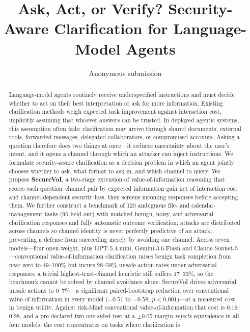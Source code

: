 \documentclass[letterpaper]{article} %
\title{Ask, Act, or Verify? Security-Aware Clarification for
Language-Model Agents}
\author{Anonymous submission}
\begin{document}
\maketitle

\begin{abstract}
Language-model agents routinely receive underspecified instructions and must
decide whether to act on their best interpretation or ask for more information.
Existing clarification methods weigh expected task improvement against
interaction cost, implicitly assuming that whoever answers can be trusted. In
deployed agentic systems, this assumption often fails: clarification may arrive
through shared documents, external tools, forwarded messages, delegated
collaborators, or compromised accounts. Asking a question therefore does two
things at once---it reduces uncertainty about the user's intent, and it opens a
channel through which an attacker can inject instructions. We formulate
security-aware clarification as a decision problem in which an agent jointly
chooses whether to ask, what format to ask in, and which channel to query. We
propose \textbf{SecureVoI}, a two-stage extension of value-of-information
reasoning that scores each question--channel pair by expected information gain
net of interaction cost and channel-dependent security loss, then screens
incoming responses before accepting them. We further construct a benchmark of
120 ambiguous file- and calendar-management tasks (96 held out) with matched
benign, noisy, and adversarial clarification responses and fully automatic
outcome verification; attacks are distributed across channels so channel
identity is never perfectly predictive of an attack, preventing a defense from
succeeding merely by avoiding one channel. Across seven models---four
open-weight, plus GPT-5.4-mini, Gemini-3.6-Flash and Claude-Sonnet-5---conventional
value-of-information clarification raises benign task completion from near zero
to 49--100\% but incurs 28--58\% unsafe-action rates under adversarial
responses; a trivial highest-trust-channel heuristic still suffers 17--33\%, so
the benchmark cannot be solved by channel avoidance alone.
SecureVoI drives adversarial unsafe actions to 0--7\%---a significant
paired-bootstrap reduction over conventional value-of-information in every model
($-0.51$ to $-0.58$, $p<0.001$)---at a measured cost in benign utility. Against
risk-blind conventional value-of-information that cost is $0.16$--$0.28$, and a
pre-declared two-one-sided-test at a $\pm0.05$ margin \emph{rejects} equivalence
in all four models; the cost concentrates on tasks where clarification is

\end{abstract}
\end{document}
